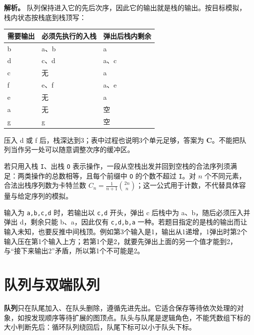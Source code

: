 \textbf{解析。} 队列保持进入它的先后次序，因此它的输出就是栈的输出。按目标模拟，栈内状态按栈底到栈顶写：

\par\medskip\noindent\begin{minipage}{\linewidth}\fontsize{9.3}{12}\selectfont\begin{tabularx}{\linewidth}{@{}YYY@{}}
\toprule\noalign{}
需要输出 & 必须先执行的入栈 & 弹出后栈内剩余 \\
\midrule\noalign{}


b & a、b & a \\
d & c、d & a、c \\
c & 无 & a \\
f & e、f & a、e \\
e & 无 & a \\
a & 无 & 空 \\
g & g & 空 \\
\bottomrule\end{tabularx}
\end{minipage}\par\medskip

压入 d 或 f 后，栈深达到3；表中过程也说明3个单元足够，答案为 \textbf{C}。不能把队列当作另一处可以随意调整次序的缓冲区。

若只用入栈 \texttt{I}、出栈 \texttt{O} 表示操作，一段从空栈出发并回到空栈的合法序列须满足：两类操作的总数相等，且每个前缀中 \texttt{O} 的个数不超过 \texttt{I}。对 \(n\) 个不同元素，合法出栈序列数为卡特兰数 \(C_n=\frac1{n+1}\binom{2n}{n}\)；这一公式用于计数，不代替具体容量与给定序列的模拟。

输入为 \texttt{a,\allowbreak{}b,\allowbreak{}c,\allowbreak{}d} 时，若输出以 \texttt{c,\allowbreak{}d} 开头，弹出 c 后栈中为 a、b，随后必须压入并弹出 d，剩余只能 b、a，因此仅有 \texttt{c,\allowbreak{}d,\allowbreak{}b,\allowbreak{}a} 一种。若题目指定的是栈的输出而让输入未知，也要反推中间栈顶。例如第3个输入是1，输出从1递增，1弹出时第2个输入压在第1个输入上方；若第1个是2，就要先弹出上面的另一个值才能到2，与``接下来输出2''矛盾，所以第1个不可能是2。

\section{队列与双端队列}\label{DS03-02}

\textbf{队列}只在队尾加入、在队头删除，遵循先进先出。它适合保存等待依次处理的对象，如按发现顺序等待扩展的图顶点。队头与队尾是逻辑角色，不能凭数组下标的大小判断先后：循环队列绕回后，队尾下标可以小于队头下标。

